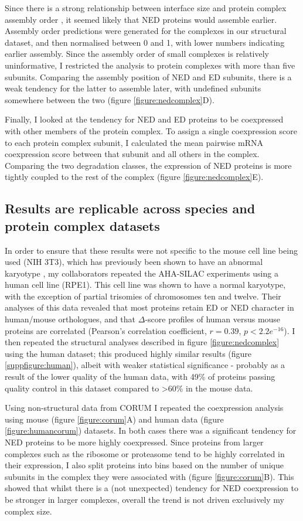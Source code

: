 \documentclass[a4paper,11pt,twoside,openright]{scrbook}
\begin{document}
Since there is a strong relationship between interface size and protein complex assembly order \cite{Marsh2013}, it seemed likely that NED proteins would assemble earlier. Assembly order predictions were generated for the complexes in our structural dataset, and then normalised between 0 and 1, with lower numbers indicating earlier assembly. Since the assembly order of small complexes is relatively uninformative, I restricted the analysis to protein complexes with more than five subunits. Comparing the assembly position of NED and ED subunits, there is a weak tendency for the latter to assemble later, with undefined subunits somewhere between the two (figure \ref{figure:nedcomplex}D).

Finally, I looked at the tendency for NED and ED proteins to be coexpressed with other members of the protein complex. To assign a single coexpression score to each protein complex subunit, I calculated the mean pairwise mRNA coexpression score between that subunit and all others in the complex. Comparing the two degradation classes, the expression of NED proteins is more tightly coupled to the rest of the complex (figure \ref{figure:nedcomplex}E).

\subsection{Results are replicable across species and protein complex datasets}
In order to ensure that these results were not specific to the mouse cell line being used (NIH 3T3), which has previously been shown to have an abnormal karyotype \cite{Leibiger2013}, my collaborators repeated the AHA-SILAC experiments using a human cell line (RPE1). This cell line was shown to have a normal karyotype, with the exception of partial trisomies of chromosomes ten and twelve. Their analyses of this data revealed that most proteins retain ED or NED character in human/mouse orthologues, and that $\Delta$-score profiles of human versus mouse proteins are correlated (Pearson’s correlation coefficient, $r = 0.39$, $p < 2.2e^{-16}$). I then repeated the structural analyses described in figure \ref{figure:nedcomplex} using the human dataset; this produced highly similar results (figure \ref{suppfigure:human}), albeit with weaker statistical significance - probably as a result of the lower quality of the human data, with 49\% of proteins passing quality control in this dataset compared to >60\% in the mouse data.

Using non-structural data from CORUM  \cite{Ruepp2009} I repeated the coexpression analysis using mouse (figure \ref{figure:corum}A) and human data (figure \ref{figure:humancorum}) datasets. In both cases there was a significant tendency for NED proteins to be more highly coexpressed. Since proteins from larger complexes such as the ribosome or proteasome tend to be highly correlated in their expression, I also split proteins into bins based on the number of unique subunits in the complex they were associated with (figure \ref{figure:corum}B). This showed that whilst there is a (not unexpected) tendency for NED coexpression to be stronger in larger complexes, overall the trend is not driven exclusively my complex size.
\end{document}
